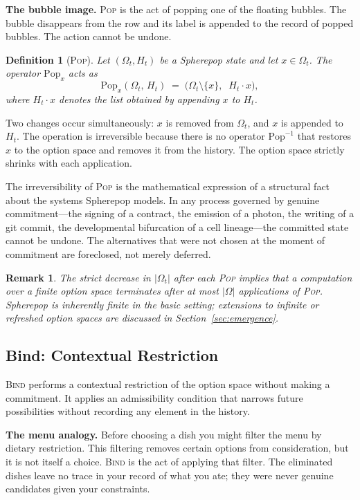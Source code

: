 \documentclass[12pt]{article}
\newtheorem{definition}{Definition}[section]
\newtheorem{remark}{Remark}[section]
\begin{document}
\medskip
\noindent \textbf{The bubble image.} \textsc{Pop} is the act of popping one of the floating bubbles. The bubble disappears from the row and its label is appended to the record of popped bubbles. The action cannot be undone.
\medskip

\begin{definition}[\textsc{Pop}]
Let $(\Omega_t, H_t)$ be a Spherepop state and let $x \in \Omega_t$. The operator $\mathrm{Pop}_x$ acts as
\[
\mathrm{Pop}_x(\Omega_t,\, H_t) \;=\; \bigl(\Omega_t \setminus \{x\},\;\; H_t \cdot x\bigr),
\]
where $H_t \cdot x$ denotes the list obtained by appending $x$ to $H_t$.
\end{definition}

Two changes occur simultaneously: $x$ is removed from $\Omega_t$, and $x$ is appended to $H_t$. The operation is irreversible because there is no operator $\mathrm{Pop}^{-1}$ that restores $x$ to the option space and removes it from the history. The option space strictly shrinks with each application.

The irreversibility of \textsc{Pop} is the mathematical expression of a structural fact about the systems Spherepop models. In any process governed by genuine commitment---the signing of a contract, the emission of a photon, the writing of a git commit, the developmental bifurcation of a cell lineage---the committed state cannot be undone. The alternatives that were not chosen at the moment of commitment are foreclosed, not merely deferred.

\begin{remark}
The strict decrease in $|\Omega_t|$ after each \textsc{Pop} implies that a computation over a finite option space terminates after at most $|\Omega|$ applications of \textsc{Pop}. Spherepop is inherently finite in the basic setting; extensions to infinite or refreshed option spaces are discussed in Section~\ref{sec:emergence}.
\end{remark}

\subsection{Bind: Contextual Restriction}

\textsc{Bind} performs a contextual restriction of the option space without making a commitment. It applies an admissibility condition that narrows future possibilities without recording any element in the history.

\medskip
\noindent \textbf{The menu analogy.} Before choosing a dish you might filter the menu by dietary restriction. This filtering removes certain options from consideration, but it is not itself a choice. \textsc{Bind} is the act of applying that filter. The eliminated dishes leave no trace in your record of what you ate; they were never genuine candidates given your constraints.
\medskip
\end{document}
